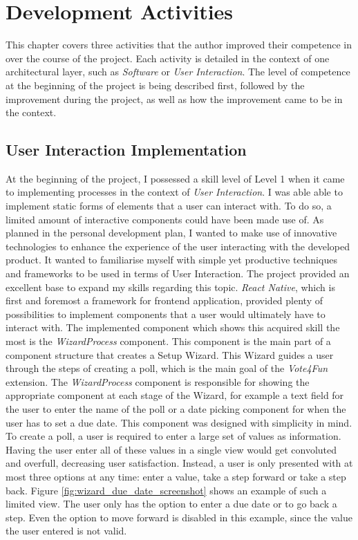 \section{Development Activities}
\label{sec:development_activities}

This chapter covers three activities that the author improved their competence in over the course of the project. Each activity is detailed in the context of one architectural layer, such as \textit{Software} or \textit{User Interaction}. The level of competence at the beginning of the project is being described first, followed by the improvement during the project, as well as how the improvement came to be in the context.

\subsection{User Interaction Implementation}
\label{ssec:user_interaction_implementation}

At the beginning of the project, I possessed a skill level of Level 1 when it came to implementing processes in the context of \textit{User Interaction}. I was able able to implement static forms of elements that a user can interact with. To do so, a limited amount of interactive components could have been made use of.
\newline
As planned in the personal development plan, I wanted to make use of innovative technologies to enhance the experience of the user interacting with the developed product. It wanted to familiarise myself with simple yet productive techniques and frameworks to be used in terms of User Interaction.
\newline
The project provided an excellent base to expand my skills regarding this topic. \textit{React Native}, which is first and foremost a framework for frontend application, provided plenty of possibilities to implement components that a user would ultimately have to interact with. The implemented component which shows this acquired skill the most is the \textit{WizardProcess} component. This component is the main part of a component structure that creates a Setup Wizard. This Wizard guides a user through the steps of creating a poll, which is the main goal of the \textit{Vote4Fun} extension. The \textit{WizardProcess} component is responsible for showing the appropriate component at each stage of the Wizard, for example a text field for the user to enter the name of the poll or a date picking component for when the user has to set a due date.
\newline
This component was designed with simplicity in mind. To create a poll, a user is required to enter a large set of values as information. Having the user enter all of these values in a single view would get convoluted and overfull, decreasing user satisfaction. Instead, a user is only presented with at most three options at any time: enter a value, take a step forward or take a step back. Figure \ref{fig:wizard_due_date_screenshot} shows an example of such a limited view. The user only has the option to enter a due date or to go back a step. Even the option to move forward is disabled in this example, since the value the user entered is not valid.

